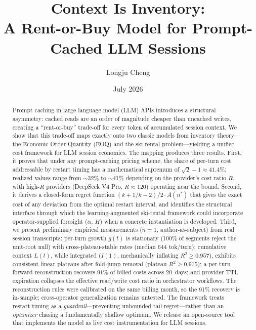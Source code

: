 \documentclass[11pt]{article}
\title{Context Is Inventory:\\ A Rent-or-Buy Model for Prompt-Cached LLM Sessions}
\author{Longju Cheng}
\date{July 2026}
\theoremstyle{definition}
\theoremstyle{remark}
\begin{document}
\maketitle

\begin{abstract}
Prompt caching in large language model (LLM) APIs introduces a structural asymmetry: cached reads are an order of magnitude cheaper than uncached writes, creating a ``rent-or-buy'' trade-off for every token of accumulated session context. We show that this trade-off maps exactly onto two classic models from inventory theory---the Economic Order Quantity (EOQ) and the ski-rental problem---yielding a unified cost framework for LLM session economics. The mapping produces three results. First, it proves that under any prompt-caching pricing scheme, the share of per-turn cost addressable by restart timing has a mathematical supremum of $\sqrt{2}-1\approx 41.4\%$; realized values range from $\sim$32\% to $\sim$41\% depending on the provider's cost ratio $R$, with high-$R$ providers (DeepSeek V4 Pro, $R{\approx}120$) operating near the bound. Second, it derives a closed-form regret function $(k + 1/k - 2)/2 \cdot A(n^*)$ that gives the exact cost of any deviation from the optimal restart interval, and identifies the structural interface through which the learning-augmented ski-rental framework could incorporate operator-supplied foresight ($\alpha$, $H$) when a concrete instantiation is developed. Third, we present preliminary empirical measurements ($n=1$, author-as-subject) from real session transcripts: per-turn growth $g(t)$ is stationary (100\% of segments reject the unit-root null) with cross-plateau-stable rates (median 644 tok/turn); cumulative context $L(t)$, while integrated ($I(1)$, mechanically inflating $R^2 \ge 0.957$), exhibits consistent linear plateaus after fold-jump removal (plateau $R^2 \ge 0.975$); a per-turn forward reconstruction recovers $91\%$ of billed costs across 20~days; and provider TTL expiration collapses the effective read/write cost ratio in orchestrator workflows. The reconstruction rules were calibrated on the same billing month, so the 91\% recovery is in-sample; cross-operator generalization remains untested. The framework treats restart timing as a \emph{guardrail}---preventing unbounded tail-regret---rather than an \emph{optimizer} chasing a fundamentally shallow optimum. We release an open-source tool that implements the model as live cost instrumentation for LLM sessions.
\end{abstract}
\end{document}
